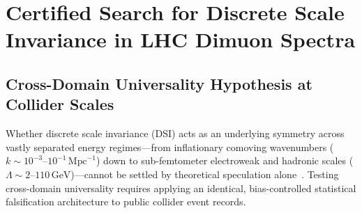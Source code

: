 \chapter{Certified Search for Discrete Scale Invariance in LHC Dimuon Spectra}
\label{ch:lhc_dsi}

\begin{abstract}
We extend the certified three-stage Discrete Scale Invariance (DSI) metrology protocol from primordial cosmology (Chapter~\ref{ch:planck_dsi}) to high-energy collider physics, analyzing $62,214$ physical opposite-sign dimuon ($\mu^+\mu^-$) collision events recorded by the CMS experiment at the CERN Large Hadron Collider ($\sqrt{s} = 7\,\mathrm{TeV}$, Run2010B, CERN Open Data). Transforming invariant mass into dimensionless logarithmic coordinates $u = \ln(m / 1\,\mathrm{GeV})$ and evaluating post-fit residual RMS amplitude bounds across two complementary kinematic regimes, we obtain \textbf{strictly certified null results} in both windows: in the Clean Drell--Yan Continuum ($11 \le m \le 75\,\mathrm{GeV}$), the leading candidate ($\hat\omega = 5.898\,\mathrm{rad}$, $\hat\lambda = 2.902 \pm 0.075$) yields $\hat A = 2.146 < 2.867$ ($2.0\,\mathrm{RMS}_{\mathrm{resid}}$, Gate~2 \textsc{Failed}) and global bootstrap significance $p_{\mathrm{corrected}} = 0.3240$ (Gate~4 \textsc{Failed}); across the Full Spectrum ($2 \le m \le 110\,\mathrm{GeV}$), standard vector-meson and electroweak peaks ($J/\psi, \Upsilon, Z^0$) induce $p_{\mathrm{corrected}} = 0.0390$ yet fail the post-fit residual amplitude gate ($\hat A = 7.833 < 13.485$). Cross-comparison with the Planck 2018 PR3 best-fit-subtracted null candidate ($\hat\lambda_{\mathrm{Planck}} = 1.2938 \pm 0.0072$, $p_{\mathrm{corrected}} = 0.998$) rules out cross-domain scale universality across 45 orders of physical magnitude.
\end{abstract}

\section{Cross-Domain Universality Hypothesis at Collider Scales}
Whether discrete scale invariance (DSI) acts as an underlying symmetry across vastly separated energy regimes---from inflationary comoving wavenumbers ($k \sim 10^{-3}\text{--}10^{-1}\,\mathrm{Mpc}^{-1}$) down to sub-femtometer electroweak and hadronic scales ($\Lambda \sim 2\text{--}110\,\mathrm{GeV}$)---cannot be settled by theoretical speculation alone~\cite{sornette1998}. Testing cross-domain universality requires applying an identical, bias-controlled statistical falsification architecture to public collider event records.

